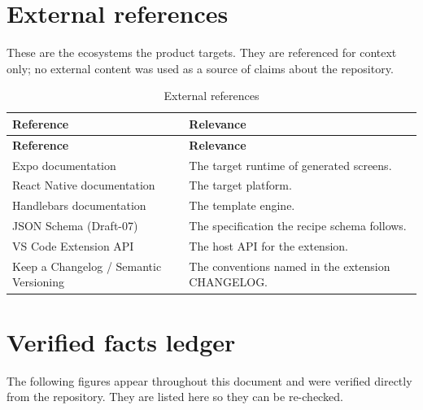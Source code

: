 \section{External references}

These are the ecosystems the product targets. They are referenced for context
only; no external content was used as a source of claims about the repository.

\begin{longtable}{@{}L{5cm}L{9.2cm}@{}}
\caption{External references}\\
\toprule
\textbf{Reference} & \textbf{Relevance} \\
\midrule
\endfirsthead
\toprule
\textbf{Reference} & \textbf{Relevance} \\
\midrule
\endhead
Expo documentation & The target runtime of generated screens. \\
React Native documentation & The target platform. \\
Handlebars documentation & The template engine. \\
JSON Schema (Draft-07) & The specification the recipe schema follows. \\
VS Code Extension API & The host API for the extension. \\
Keep a Changelog / Semantic Versioning & The conventions named in the extension
CHANGELOG. \\
\bottomrule
\end{longtable}

\section{Verified facts ledger}

The following figures appear throughout this document and were verified directly
from the repository. They are listed here so they can be re-checked.

